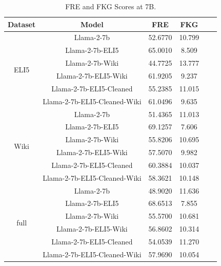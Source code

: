 \documentclass[11pt, oneside]{article}   	%
\begin{document}
\begin{table}
\centering
\begin{tabular}{cccccc}
\hline
Dataset & Model & FRE & FKG \\
\hline
\multirow{6}{*}{ELI5} & Llama-2-7b & 52.6770 & 10.799 \\
 & Llama-2-7b-ELI5 & 65.0010 & 8.509 \\
 & Llama-2-7b-Wiki & 44.7725 & 13.777 \\
 & Llama-2-7b-ELI5-Wiki & 61.9205 & 9.237 \\
  & Llama-2-7b-ELI5-Cleaned & 55.2385 & 11.015 \\
 & Llama-2-7b-ELI5-Cleaned-Wiki & 61.0496 & 9.635 \\
\hline
\multirow{6}{*}{Wiki} & Llama-2-7b & 51.4365 & 11.013 \\
 & Llama-2-7b-ELI5 & 69.1257 & 7.606 \\
 & Llama-2-7b-Wiki & 55.8206 & 10.695 \\
 & Llama-2-7b-ELI5-Wiki & 57.5070 & 9.982 \\
  & Llama-2-7b-ELI5-Cleaned & 60.3884 & 10.037 \\
 & Llama-2-7b-ELI5-Cleaned-Wiki & 58.3621 & 10.148 \\
\hline
\multirow{6}{*}{full} & Llama-2-7b & 48.9020 & 11.636 \\
 & Llama-2-7b-ELI5 & 68.6513 & 7.855 \\
 & Llama-2-7b-Wiki & 55.5700 & 10.681 \\
 & Llama-2-7b-ELI5-Wiki & 56.8602 & 10.314 \\
  & Llama-2-7b-ELI5-Cleaned & 54.0539 & 11.270 \\
 & Llama-2-7b-ELI5-Cleaned-Wiki & 57.9690 & 10.054 \\
\hline
\end{tabular}
\caption{FRE and FKG Scores at 7B.}
\label{tab:flesch_scores_7B}
\end{table}
\end{document}

